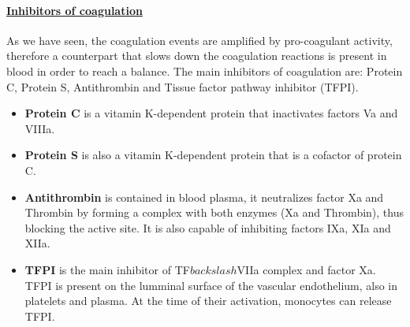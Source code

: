 \documentclass[%
 nofootinbib,
 amsmath,amssymb,
 aps,
 pra,
]{revtex4-1}
\begin{document}
\paragraph{\underline{Inhibitors of coagulation}}
As we have seen, the coagulation events are amplified by pro-coagulant activity, therefore a counterpart that slows down the coagulation reactions is present in blood in order to reach a balance. The main inhibitors of coagulation are: Protein C, Protein S, Antithrombin and %
Tissue factor pathway inhibitor (TFPI).\\
\begin{itemize}
\item \textbf{Protein C} is a vitamin K-dependent protein that inactivates factors Va and VIIIa.
\item \textbf{Protein S} is also a vitamin K-dependent protein that is a cofactor of protein C.
\item \textbf{Antithrombin} is contained in blood plasma, it neutralizes factor Xa and Thrombin by forming a complex with both enzymes (Xa and Thrombin), thus blocking the active site. It is also capable of inhibiting factors IXa, XIa and XIIa.\\
\item \textbf{TFPI} is the main inhibitor of TF$backslash$VIIa complex and factor Xa. TFPI is present on the lumminal surface of the vascular endothelium, also in platelets and plasma. At the time of their activation, monocytes can release TFPI. 
\end{itemize}
\end{document}
